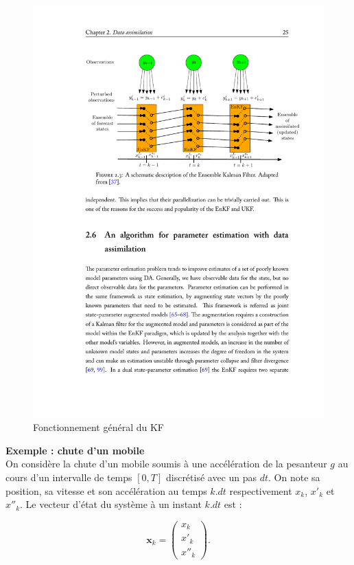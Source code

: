 \documentclass[a4paper]{article}
\newcounter{c}
\newcounter{d}
\newcounter{r}
\newcounter{e}
\newcommand{\chapitre}[1]{\stepcounter{c}\setcounter{e}{0}\setcounter{d}{0}\setcounter{r}{0}\noindent\textbf{\Large#1}\\}
\newcommand{\x}{\mathbf x}
\begin{document}
\begin{figure}[!h]
\includegraphics[width=\textwidth,trim = 3.5cm 22cm 3cm 3.5cm, clip]{kfchart.pdf}
\caption{Fonctionnement général du KF}
\end{figure}

\newpage
\chapitre{Exemple : chute d'un mobile}

On considère la chute d'un mobile soumis à une accélération de la pesanteur $g$ au cours d'un intervalle de temps $[0,T]$ discrétisé avec un pas $dt$. On note sa position, sa vitesse et son accélération au temps $k.dt$ respectivement $x_k$, $x'_k$ et $x''_k$. Le vecteur d'état du système à un instant $k.dt$ est :

$$\x_k=\left(\begin{matrix}x_k\\x'_k\\x''_k\end{matrix}\right).$$
\end{document}
